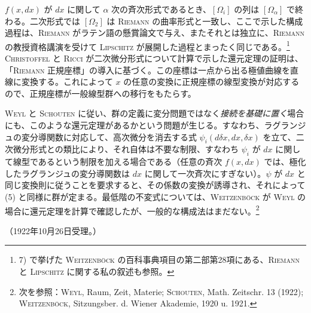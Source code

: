 \documentclass[11pt]{article}
\begin{document}
$f(x,d x)$ が $d x$ に関して $\alpha$ 次の斉次形式であるとき、$[\Omega_i]$ の列は $[\Omega_\alpha]$ で終わる。二次形式では $[\Omega_2]$ は \textsc{Riemann} の曲率形式と一致し、ここで示した構成過程は、\textsc{Riemann} がラテン語の懸賞論文で与え、またそれとは独立に、\textsc{Riemann} の教授資格講演を受けて \textsc{Lipschitz} が展開した過程とまったく同じである。\footnote{7) で挙げた \textsc{Weitzenböck} の百科事典項目の第二部第28項にある、\textsc{Riemann} と \textsc{Lipschitz} に関する私の叙述も参照。} \textsc{Christoffel} と \textsc{Ricci} が二次微分形式について計算で示した還元定理の証明は、「\textsc{Riemann} 正規座標」の導入に基づく。この座標は一点から出る極値曲線を直線に変換する。これによって $x$ の任意の変換に正規座標の線型変換が対応するので、正規座標が一般線型群への移行をもたらす。

\textsc{Weyl} と \textsc{Schouten} に従い、群の定義に変分問題ではなく\emph{接続を基礎に置く}場合にも、このような還元定理があるかという問題が生じる。すなわち、ラグランジュの変分導関数に対応して、高次微分を消去する式 $\psi_i(d\delta x,d x,\delta x)$ を立て、二次微分形式との類比により、それ自体は不要な制限、すなわち $\psi_i$ が $d x$ に関して線型であるという制限を加える場合である（任意の斉次 $f(x,d x)$ では、極化したラグランジュの変分導関数は $d x$ に関して一次斉次にすぎない）。$\psi$ が $d x$ と同じ変換則に従うことを要求すると、その係数の変換が誘導され、それによって (5) と同様に群が定まる。最低階の不変式については、\textsc{Weitzenböck} が \textsc{Weyl} の場合に還元定理を計算で確認したが、一般的な構成法はまだない。\footnote{次を参照：\textsc{Weyl}, Raum, Zeit, Materie; \textsc{Schouten}, Math. Zeitschr. 13 (1922); \textsc{Weitzenböck}, Sitzungsber. d. Wiener Akademie, 1920 u. 1921.}

\begin{center}
（1922年10月26日受理。）
\end{center}
\endgroup

\clearpage
\setcounter{footnote}{0}
\end{document}
